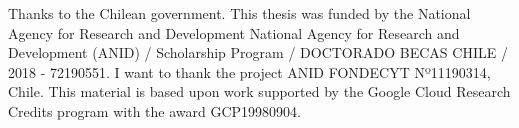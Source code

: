 Thanks to the Chilean government. This thesis was funded by the National Agency for Research and Development National Agency for Research and Development (ANID) / Scholarship Program / DOCTORADO BECAS CHILE / 2018 - 72190551. I want to thank the project ANID FONDECYT Nº11190314, Chile. This material is based upon work supported by the Google Cloud Research Credits program with the award GCP19980904.
